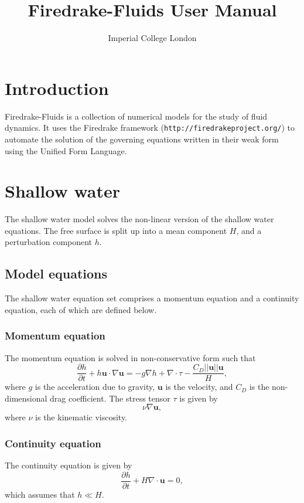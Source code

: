 \documentclass[a4paper,11pt]{report}
\title{Firedrake-Fluids User Manual}
\author{Imperial College London}
\begin{document}
\maketitle
\tableofcontents

\setlength{\parskip}{0.3cm}
\setlength{\parindent}{0cm}

\chapter{Introduction}
Firedrake-Fluids is a collection of numerical models for the study of fluid dynamics. It uses the Firedrake framework (\texttt{http://firedrakeproject.org/}) to automate the solution of the governing equations written in their weak form using the Unified Form Language.

\chapter{Shallow water}
The shallow water model solves the non-linear version of the shallow water equations. The free surface is split up into a mean component $H$, and a perturbation component $h$.

\section{Model equations}
The shallow water equation set comprises a momentum equation and a continuity equation, each of which are defined below.

\subsection{Momentum equation}
The momentum equation is solved in non-conservative form such that
\begin{equation}
   \frac{\partial h}{\partial t} + h\mathbf{u}\cdot\nabla\mathbf{u} = -g\nabla h + \nabla\cdot\tau - \frac{C_D||\mathbf{u}||\mathbf{u}}{H},
\end{equation}
where $g$ is the acceleration due to gravity, $\mathbf{u}$ is the velocity, and $C_D$ is the non-dimensional drag coefficient. The stress tensor $\tau$ is given by 
\begin{equation}
   \nu\nabla\mathbf{u},
\end{equation}
where $\nu$ is the kinematic viscosity.

\subsection{Continuity equation}
The continuity equation is given by
\begin{equation}
   \frac{\partial h}{\partial t} + H\nabla\cdot\mathbf{u} = 0,
\end{equation}
which assumes that $h \ll H$.
\end{document}
